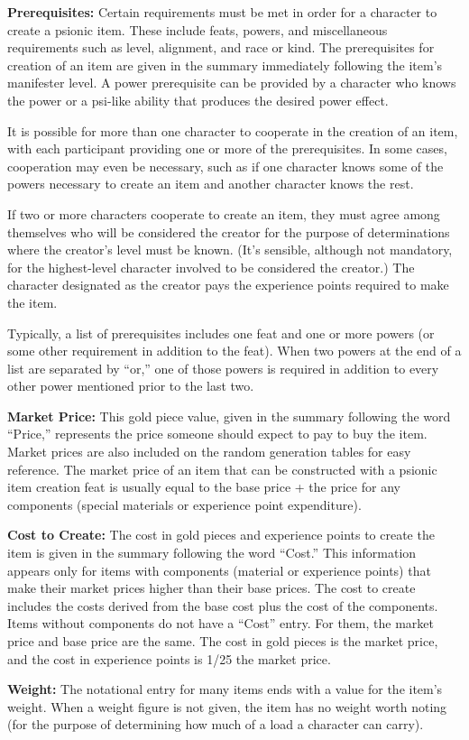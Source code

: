 \textbf{Prerequisites:} Certain requirements must be met in order for a character to create a psionic item. These include feats, powers, and miscellaneous requirements such as level, alignment, and race or kind. The prerequisites for creation of an item are given in the summary immediately following the item's manifester level. A power prerequisite can be provided by a character who knows the power or a psi-like ability that produces the desired power effect.

It is possible for more than one character to cooperate in the creation of an item, with each participant providing one or more of the prerequisites. In some cases, cooperation may even be necessary, such as if one character knows some of the powers necessary to create an item and another character knows the rest.

If two or more characters cooperate to create an item, they must agree among themselves who will be considered the creator for the purpose of determinations where the creator's level must be known. (It's sensible, although not mandatory, for the highest-level character involved to be considered the creator.) The character designated as the creator pays the experience points required to make the item.

Typically, a list of prerequisites includes one feat and one or more powers (or some other requirement in addition to the feat). When two powers at the end of a list are separated by ``or,'' one of those powers is required in addition to every other power mentioned prior to the last two.

\textbf{Market Price:} This gold piece value, given in the summary following the word ``Price,'' represents the price someone should expect to pay to buy the item. Market prices are also included on the random generation tables for easy reference. The market price of an item that can be constructed with a psionic item creation feat is usually equal to the base price + the price for any components (special materials or experience point expenditure).

\textbf{Cost to Create:} The cost in gold pieces and experience points to create the item is given in the summary following the word ``Cost.'' This information appears only for items with components (material or experience points) that make their market prices higher than their base prices. The cost to create includes the costs derived from the base cost plus the cost of the components. Items without components do not have a ``Cost'' entry. For them, the market price and base price are the same. The cost in gold pieces is \onehalf the market price, and the cost in experience points is 1/25 the market price.

\textbf{Weight:} The notational entry for many items ends with a value for the item's weight. When a weight figure is not given, the item has no weight worth noting (for the purpose of determining how much of a load a character can carry).